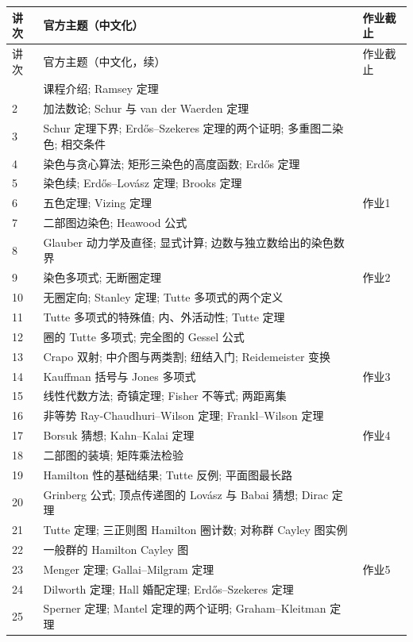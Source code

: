 \begin{longtable}{@{}p{.065\linewidth}p{.735\linewidth}p{.135\linewidth}@{}}
\toprule
讲次 & 官方主题（中文化） & 作业截止\\
\midrule
\endfirsthead
\toprule
讲次 & 官方主题（中文化，续） & 作业截止\\
\midrule
\endhead
\bottomrule
\endfoot
1 & 课程介绍; Ramsey 定理 & \\
2 & 加法数论; Schur 与 van der Waerden 定理 & \\
3 & Schur 定理下界; Erdős--Szekeres 定理的两个证明; 多重图二染色; 相交条件 & \\
4 & 染色与贪心算法; 矩形三染色的高度函数; Erdős 定理 & \\
5 & 染色续; Erdős--Lovász 定理; Brooks 定理 & \\
6 & 五色定理; Vizing 定理 & 作业1\\
7 & 二部图边染色; Heawood 公式 & \\
8 & Glauber 动力学及直径; 显式计算; 边数与独立数给出的染色数界 & \\
9 & 染色多项式; 无断圈定理 & 作业2\\
10 & 无圈定向; Stanley 定理; Tutte 多项式的两个定义 & \\
11 & Tutte 多项式的特殊值; 内、外活动性; Tutte 定理 & \\
12 & 圈的 Tutte 多项式; 完全图的 Gessel 公式 & \\
13 & Crapo 双射; 中介图与两类割; 纽结入门; Reidemeister 变换 & \\
14 & Kauffman 括号与 Jones 多项式 & 作业3\\
15 & 线性代数方法; 奇镇定理; Fisher 不等式; 两距离集 & \\
16 & 非等势 Ray-Chaudhuri--Wilson 定理; Frankl--Wilson 定理 & \\
17 & Borsuk 猜想; Kahn--Kalai 定理 & 作业4\\
18 & 二部图的装填; 矩阵乘法检验 & \\
19 & Hamilton 性的基础结果; Tutte 反例; 平面图最长路 & \\
20 & Grinberg 公式; 顶点传递图的 Lovász 与 Babai 猜想; Dirac 定理 & \\
21 & Tutte 定理; 三正则图 Hamilton 圈计数; 对称群 Cayley 图实例 & \\
22 & 一般群的 Hamilton Cayley 图 & \\
23 & Menger 定理; Gallai--Milgram 定理 & 作业5\\
24 & Dilworth 定理; Hall 婚配定理; Erdős--Szekeres 定理 & \\
25 & Sperner 定理; Mantel 定理的两个证明; Graham--Kleitman 定理 & \\

\end{longtable}
